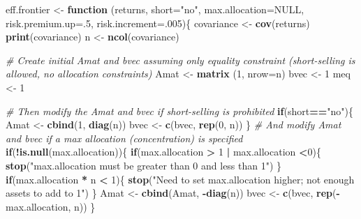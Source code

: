 \documentclass[]{article}
\newenvironment{Shaded}{\begin{snugshade}}{\end{snugshade}}
\newcommand{\KeywordTok}[1]{\textcolor[rgb]{0.13,0.29,0.53}{\textbf{#1}}}
\newcommand{\DataTypeTok}[1]{\textcolor[rgb]{0.13,0.29,0.53}{#1}}
\newcommand{\DecValTok}[1]{\textcolor[rgb]{0.00,0.00,0.81}{#1}}
\newcommand{\StringTok}[1]{\textcolor[rgb]{0.31,0.60,0.02}{#1}}
\newcommand{\CommentTok}[1]{\textcolor[rgb]{0.56,0.35,0.01}{\textit{#1}}}
\newcommand{\OtherTok}[1]{\textcolor[rgb]{0.56,0.35,0.01}{#1}}
\newcommand{\ControlFlowTok}[1]{\textcolor[rgb]{0.13,0.29,0.53}{\textbf{#1}}}
\newcommand{\OperatorTok}[1]{\textcolor[rgb]{0.81,0.36,0.00}{\textbf{#1}}}
\newcommand{\NormalTok}[1]{#1}
\begin{document}
\begin{Shaded}
\begin{Highlighting}[]
\NormalTok{eff.frontier <-}\StringTok{ }\ControlFlowTok{function}\NormalTok{ (returns, }\DataTypeTok{short=}\StringTok{"no"}\NormalTok{, }\DataTypeTok{max.allocation=}\OtherTok{NULL}\NormalTok{, }\DataTypeTok{risk.premium.up=}\NormalTok{.}\DecValTok{5}\NormalTok{, }\DataTypeTok{risk.increment=}\NormalTok{.}\DecValTok{005}\NormalTok{)\{}
\NormalTok{        covariance <-}\StringTok{ }\KeywordTok{cov}\NormalTok{(returns)}
        \KeywordTok{print}\NormalTok{(covariance)}
\NormalTok{        n <-}\StringTok{ }\KeywordTok{ncol}\NormalTok{(covariance)}
 
\CommentTok{# Create initial Amat and bvec assuming only equality constraint (short-selling is allowed, no allocation constraints)}
\NormalTok{Amat <-}\StringTok{ }\KeywordTok{matrix}\NormalTok{ (}\DecValTok{1}\NormalTok{, }\DataTypeTok{nrow=}\NormalTok{n)}
\NormalTok{bvec <-}\StringTok{ }\DecValTok{1}
\NormalTok{meq <-}\StringTok{ }\DecValTok{1}
 
\CommentTok{# Then modify the Amat and bvec if short-selling is prohibited}
\ControlFlowTok{if}\NormalTok{(short}\OperatorTok{==}\StringTok{"no"}\NormalTok{)\{}
\NormalTok{Amat <-}\StringTok{ }\KeywordTok{cbind}\NormalTok{(}\DecValTok{1}\NormalTok{, }\KeywordTok{diag}\NormalTok{(n))}
\NormalTok{bvec <-}\StringTok{ }\KeywordTok{c}\NormalTok{(bvec, }\KeywordTok{rep}\NormalTok{(}\DecValTok{0}\NormalTok{, n))}
\NormalTok{\}}
\CommentTok{# And modify Amat and bvec if a max allocation (concentration) is specified}
\ControlFlowTok{if}\NormalTok{(}\OperatorTok{!}\KeywordTok{is.null}\NormalTok{(max.allocation))\{}
\ControlFlowTok{if}\NormalTok{(max.allocation }\OperatorTok{>}\StringTok{ }\DecValTok{1} \OperatorTok{|}\StringTok{ }\NormalTok{max.allocation }\OperatorTok{<}\DecValTok{0}\NormalTok{)\{}
\KeywordTok{stop}\NormalTok{(}\StringTok{"max.allocation must be greater than 0 and less than 1"}\NormalTok{)}
\NormalTok{\}}
\ControlFlowTok{if}\NormalTok{(max.allocation }\OperatorTok{*}\StringTok{ }\NormalTok{n }\OperatorTok{<}\StringTok{ }\DecValTok{1}\NormalTok{)\{}
\KeywordTok{stop}\NormalTok{(}\StringTok{"Need to set max.allocation higher; not enough assets to add to 1"}\NormalTok{)}
\NormalTok{\}}
\NormalTok{Amat <-}\StringTok{ }\KeywordTok{cbind}\NormalTok{(Amat, }\OperatorTok{-}\KeywordTok{diag}\NormalTok{(n))}
\NormalTok{bvec <-}\StringTok{ }\KeywordTok{c}\NormalTok{(bvec, }\KeywordTok{rep}\NormalTok{(}\OperatorTok{-}\NormalTok{max.allocation, n))}
\NormalTok{\}}
 

\end{Highlighting}
\end{Shaded}
\end{document}
